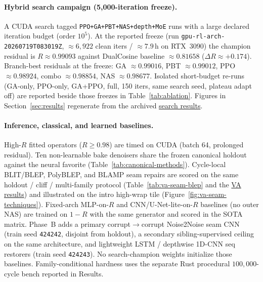 \paragraph{Hybrid search campaign (5,000-iteration freeze).}
A CUDA search tagged \texttt{PPO+GA+PBT+NAS+depth+MoE} runs with a large declared iteration budget (order $10^{5}$).
At the reported freeze (run \texttt{gpu-rl-arch-20260719T083019Z}, $\approx 6{,}922$ clean iters / $\approx 7.9$\,h on RTX~3090) the champion residual is $R\approx 0.99093$ against DualCosine baseline $\approx 0.81658$ ($\Delta R\approx{+}0.174$).
Branch-best residuals at the freeze: GA $\approx 0.99016$, PBT $\approx 0.99012$, PPO $\approx 0.98924$, combo $\approx 0.98854$, NAS $\approx 0.98677$.
Isolated short-budget re-runs (GA-only, PPO-only, GA{+}PPO, full, 150 iters, same search seed, plateau adapt off) are reported beside those freezes in Table~\ref{tab:ablation}.
Figures in Section~\ref{sec:results} regenerate from the archived \href{https://github.com/reeldemo/denoise-opt-meta/blob/master/paper/Unsupervised_Wavetable_Seam_Artifact_Repair_via_Hybrid_GA-PPO_Meta-Search_v11/figures/meta_approach_compare_v10.json}{search results}.

\paragraph{Inference, classical, and learned baselines.}
High-$R$ fitted operators ($R\ge 0.98$) are timed on CUDA (batch 64, prolonged residual).
Ten non-learnable bake denoisers share the frozen canonical holdout against the neural favorite (Table~\ref{tab:canonical-methods}).
Cycle-local BLIT/BLEP, PolyBLEP, and BLAMP seam repairs are scored on the same holdout / cliff / multi-family protocol (Table~\ref{tab:va-seam-blep} and the \href{https://github.com/reeldemo/denoise-opt-meta/blob/master/paper/Unsupervised_Wavetable_Seam_Artifact_Repair_via_Hybrid_GA-PPO_Meta-Search_v11/figures/va_seam_blep.json}{VA results}) and illustrated on the intro high-wrap tile (Figure~\ref{fig:va-seam-techniques}).
Fixed-arch MLP-on-$R$ and CNN/U-Net-lite-on-$R$ baselines (no outer NAS) are trained on $1{-}R$ with the same generator and scored in the SOTA matrix.
Phase~B adds a primary corrupt$\to$corrupt Noise2Noise seam CNN (train seed \texttt{424242}, disjoint from holdout), a secondary sibling-supervised ceiling on the same architecture, and lightweight LSTM / depthwise 1D-CNN seq restorers (train seed \texttt{424243}).
No search-champion weights initialize those baselines.
Family-conditional hardness uses the separate Rust procedural $100{,}000$-cycle bench reported in Results.

